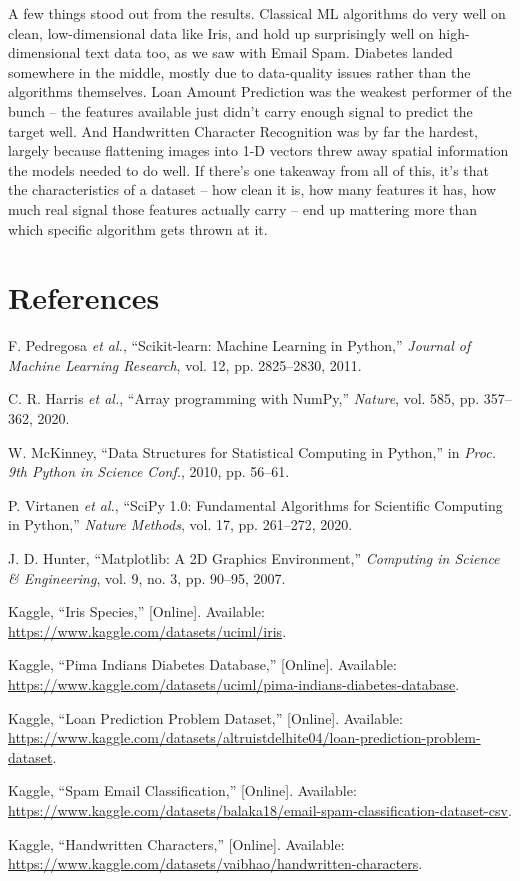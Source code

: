 \documentclass[12pt,a4paper]{article}
\begin{document}
A few things stood out from the results. Classical ML algorithms do very well on clean, low-dimensional data like Iris, and hold up surprisingly well on high-dimensional text data too, as we saw with Email Spam. Diabetes landed somewhere in the middle, mostly due to data-quality issues rather than the algorithms themselves. Loan Amount Prediction was the weakest performer of the bunch -- the features available just didn't carry enough signal to predict the target well. And Handwritten Character Recognition was by far the hardest, largely because flattening images into 1-D vectors threw away spatial information the models needed to do well. If there's one takeaway from all of this, it's that the characteristics of a dataset -- how clean it is, how many features it has, how much real signal those features actually carry -- end up mattering more than which specific algorithm gets thrown at it.
 
\section{References}
\begin{enumerate}[label={[\arabic*]}]
\item F. Pedregosa \textit{et al.}, ``Scikit-learn: Machine Learning in Python,'' \textit{Journal of Machine Learning Research}, vol. 12, pp. 2825--2830, 2011.
\item C. R. Harris \textit{et al.}, ``Array programming with NumPy,'' \textit{Nature}, vol. 585, pp. 357--362, 2020.
\item W. McKinney, ``Data Structures for Statistical Computing in Python,'' in \textit{Proc. 9th Python in Science Conf.}, 2010, pp. 56--61.
\item P. Virtanen \textit{et al.}, ``SciPy 1.0: Fundamental Algorithms for Scientific Computing in Python,'' \textit{Nature Methods}, vol. 17, pp. 261--272, 2020.
\item J. D. Hunter, ``Matplotlib: A 2D Graphics Environment,'' \textit{Computing in Science \& Engineering}, vol. 9, no. 3, pp. 90--95, 2007.
\item Kaggle, ``Iris Species,'' [Online]. Available: \url{https://www.kaggle.com/datasets/uciml/iris}.
\item Kaggle, ``Pima Indians Diabetes Database,'' [Online]. Available: \url{https://www.kaggle.com/datasets/uciml/pima-indians-diabetes-database}.
\item Kaggle, ``Loan Prediction Problem Dataset,'' [Online]. Available: \url{https://www.kaggle.com/datasets/altruistdelhite04/loan-prediction-problem-dataset}.
\item Kaggle, ``Spam Email Classification,'' [Online]. Available: \url{https://www.kaggle.com/datasets/balaka18/email-spam-classification-dataset-csv}.
\item Kaggle, ``Handwritten Characters,'' [Online]. Available: \url{https://www.kaggle.com/datasets/vaibhao/handwritten-characters}.
\end{enumerate}
 
\end{document}
